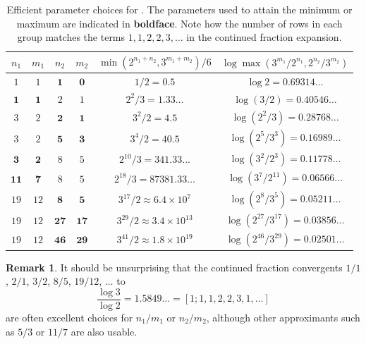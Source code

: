 \documentclass[10pt,a4paper,reqno]{amsart}
\numberwithin{equation}{section}
\theoremstyle{plain}
\theoremstyle{definition}
\newtheorem{remark}[theorem]{Remark}
\begin{document}
\begin{table}[ht]
\centering
\begin{tabular}{|c|c|c|c|c|c|}
\hline
\rule{0pt}{12pt}$n_1$ & $m_1$ & $n_2$ & $m_2$ & $\min(2^{n_1+n_2},3^{m_1+m_2})/6$ & $\log \max(3^{m_1}/2^{n_1}, 2^{n_2}/3^{m_2})$ \\[2pt]
\hline
\rule{0pt}{12pt}$1$ & $1$ & $\mathbf{1}$ & $\mathbf{0}$ & $1/2 = 0.5$ & $\log 2 = 0.69314\dots$ \\
\hline
\rule{0pt}{12pt}$\mathbf{1}$ & $\mathbf{1}$ & $2$ & $1$ & $2^2/3 = 1.33\dots$ & $\log (3/2) = 0.40546\dots$\\
\hline
\rule{0pt}{12pt}$3$ & $2$ & $\mathbf{2}$ & $\mathbf{1}$ & $3^2/2 = 4.5$ & $\log (2^2/3) = 0.28768\dots$ \\
$3$ & $2$ & $\mathbf{5}$ & $\mathbf{3}$ & $3^4/2 = 40.5$ & $\log (2^5/3^3) = 0.16989\dots$ \\
\hline
\rule{0pt}{12pt}$\mathbf{3}$ & $\mathbf{2}$ & $8$ & $5$ & $2^{10}/3 = 341.33\dots$ & $\log (3^2/2^3) = 0.11778\dots$\\ 
$\mathbf{11}$ & $\mathbf{7}$ & $8$ & $5$ & $2^{18}/3 = 87381.33\dots$ & $\log (3^7/2^{11}) = 0.06566\dots$ \\
\hline
\rule{0pt}{12pt}$19$ & $12$ & $\mathbf{8}$ & $\mathbf{5}$ & $3^{17}/2 \approx 6.4 \times 10^7$ & $\log (2^8/3^5) = 0.05211\dots$ \\
$19$ & $12$ & $\mathbf{27}$ & $\mathbf{17}$ & $3^{29}/2 \approx 3.4 \times 10^{13}$ & $\log (2^{27}/3^{17}) = 0.03856\dots$ \\
$19$ & $12$ & $\mathbf{46}$ & $\mathbf{29}$ & $3^{41}/2 \approx 1.8 \times 10^{19} $ & $\log (2^{46}/3^{29}) = 0.02501\dots$ \\
\hline
\end{tabular}
\bigskip

\caption{Efficient parameter choices for .  The parameters used to attain the minimum or maximum are indicated in \textbf{boldface}. Note how the number of rows in each group matches the terms $1,1,2,2,3,\dots$ in the continued fraction expansion.}\label{approx-table}
\end{table}

\begin{remark}
It should be unsurprising that the continued fraction convergents $1/1$, $2/1$, $3/2$, $8/5$, $19/12$, $\dots$ to 
$$\frac{\log 3}{\log 2} = 1.5849\dots = [1; 1,1,2,2,3,1,\dots]$$
are often excellent choices for $n_1/m_1$ or $n_2/m_2$, although other approximants such as $5/3$ or $11/7$ are also usable.
\end{remark}
\end{document}
